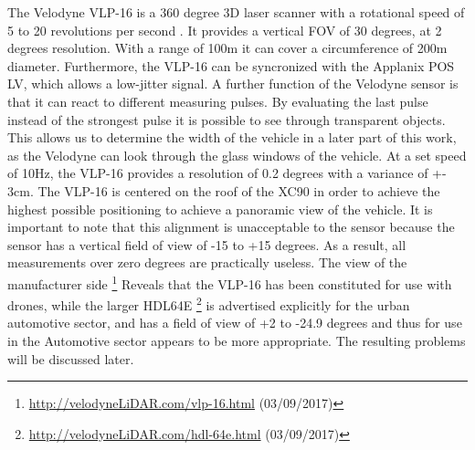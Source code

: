 The Velodyne VLP-16 is a 360 degree 3D laser scanner with a rotational speed of 5 to 20 revolutions per second \cite{manVEL}.
It provides a vertical FOV of 30 degrees, at 2 degrees resolution.
With a range of 100m it can cover a circumference of 200m diameter. 
Furthermore, the VLP-16 can be syncronized with the Applanix POS LV, which allows a low-jitter signal. 
A further function of the Velodyne sensor is that it can react to different measuring pulses. 
By evaluating the last pulse instead of the strongest pulse it is possible to see through transparent objects. 
This allows us to determine the width of the vehicle in a later part of this work, as the Velodyne can look through the glass windows of the vehicle. 
At a set speed of 10Hz, the VLP-16 provides a resolution of 0.2 degrees with a variance of +- 3cm. 
The VLP-16 is centered on the roof of the XC90 in order to achieve the highest possible positioning to achieve a panoramic view of the vehicle.
It is important to note that this alignment is unacceptable to the sensor because the sensor has a vertical field of view of -15 to +15 degrees.
As a result, all measurements over zero degrees are practically useless. The view of the manufacturer side
\footnote{\url{http://velodyneLiDAR.com/vlp-16.html} (03/09/2017)}
Reveals that the VLP-16 has been constituted for use with drones, while the larger HDL64E
\footnote{\url{http://velodyneLiDAR.com/hdl-64e.html} (03/09/2017)}
is advertised explicitly for the urban automotive sector, and has a field of view of +2 to -24.9 degrees and thus for use in the
Automotive sector appears to be more appropriate. The resulting problems will be discussed later.






